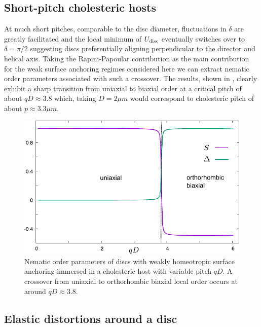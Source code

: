 \subsection{Short-pitch cholesteric hosts}


 At much short pitches,  comparable to the disc diameter, fluctuations in $\delta$ are greatly facilitated and the local minimum of $U_{\rm disc}$ eventually switches over to $\delta = \pi/2$ suggesting  discs  preferentially aligning perpendicular to the director and helical axis.  Taking the Rapini-Papoular contribution  as the main contribution for the weak surface anchoring regimes considered here we can extract  nematic order parameters associated with such a crossover.  The results, shown in , clearly exhibit a sharp transition from uniaxial to biaxial order at a critical pitch of about $qD \approx 3.8$ which, taking $D =2 \mu m$ would correspond to cholesteric pitch of about $p \approx 3.3 \mu m$.



\begin{figure}
	\includegraphics[width =  .8\columnwidth]{figures/chapter-3/discubx}
	\caption[Nematic order parameters of discs with weakly homeotropic surface anchoring immersed in a cholesteric host]{Nematic order parameters of discs with weakly homeotropic surface anchoring immersed in a cholesteric host with variable pitch $qD$. A crossover from uniaxial to orthorhombic biaxial local order occurs at around $qD \approx 3.8$.  }
	\label{disop}
\end{figure}



\subsection{Elastic distortions around a disc}

